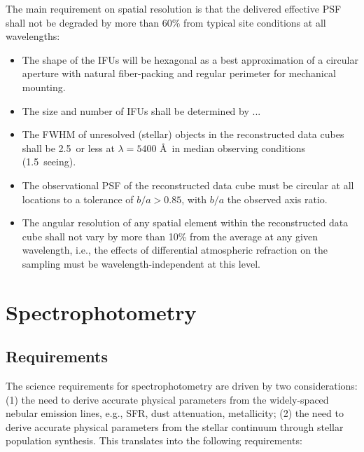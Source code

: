 \documentclass[preprint,11pt]{aastex}
\begin{document}
\medskip
\noindent The main requirement on spatial resolution is that the delivered effective PSF shall not be degraded by more than 60\% from typical site conditions at all wavelengths:


\begin{itemize}

\item The shape of the IFUs will be hexagonal as a best approximation
  of a circular aperture with natural fiber-packing and regular
  perimeter for mechanical mounting.

\item The size and number of IFUs shall be determined by ...

\item The FWHM of unresolved (stellar) objects in the reconstructed data
  cubes shall be 2.5\arcsec\ or less at $\lambda = 5400$ \AA\ in median
  observing conditions (1.5\arcsec\ seeing).

\item The observational PSF of the reconstructed data cube must be
  circular at all locations to a tolerance of $b/a > 0.85$, with $b/a$
  the observed axis ratio.

\item The angular resolution of any spatial element within the
  reconstructed data cube shall not vary by more than 10\% from the
  average at any given wavelength, i.e., the effects of differential
  atmospheric refraction on the sampling must be
  wavelength-independent at this level.


\end{itemize}



\section{Spectrophotometry} \label{sec:spectrophotometry}

\subsection{Requirements}

The science requirements for spectrophotometry are driven by two
considerations: (1) the need to derive accurate physical parameters
from the widely-spaced nebular emission lines, e.g., SFR, dust
attenuation, metallicity; (2) the need to derive accurate physical
parameters from the stellar continuum through stellar population
synthesis. This translates into the following requirements:
\end{document}
